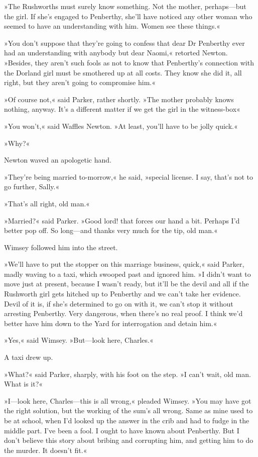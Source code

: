 »The Rushworths must surely know something. Not the mother, perhaps\allowbreak---\allowbreak but the girl. If she's engaged to Penberthy, she'll have noticed any other woman who seemed to have an understanding with him. Women see these things.«

»You don't suppose that they're going to confess that dear Dr Penberthy ever had an understanding with anybody but dear Naomi,« retorted Newton. »Besides, they aren't such fools as not to know that Penberthy's connection with the Dorland girl must be smothered up at all costs. They know she did it, all right, but they aren't going to compromise him.«

»Of course not,« said Parker, rather shortly. »The mother probably knows nothing, anyway. It's a different matter if we get the girl in the witness-box\longdash«

»You won't,« said Waffles Newton. »At least, you'll have to be jolly quick.«

»Why?«

Newton waved an apologetic hand.

»They're being married to-morrow,« he said, »special license. I say, that's not to go further, Sally.«

»That's all right, old man.«

»Married?« said Parker. »Good lord! that forces our hand a bit. Perhaps I'd better pop off. So long\allowbreak---\allowbreak and thanks very much for the tip, old man.«

Wimsey followed him into the street.

»We'll have to put the stopper on this marriage business, quick,« said Parker, madly waving to a taxi, which swooped past and ignored him. »I didn't want to move just at present, because I wasn't ready, but it'll be the devil and all if the Rushworth girl gets hitched up to Penberthy and we can't take her evidence. Devil of it is, if she's determined to go on with it, we can't stop it without arresting Penberthy. Very dangerous, when there's no real proof. I think we'd better have him down to the Yard for interrogation and detain him.«

»Yes,« said Wimsey. »But\allowbreak---\allowbreak look here, Charles.«

A taxi drew up.

»What?« said Parker, sharply, with his foot on the step. »I can't wait, old man. What is it?«

»I\allowbreak---\allowbreak look here, Charles\allowbreak---\allowbreak this is all wrong,« pleaded Wimsey. »You may have got the right solution, but the working of the sum's all wrong. Same as mine used to be at school, when I'd looked up the answer in the crib and had to fudge in the middle part. I've been a fool. I ought to have known about Penberthy. But I don't believe this story about bribing and corrupting him, and getting him to do the murder. It doesn't fit.«

